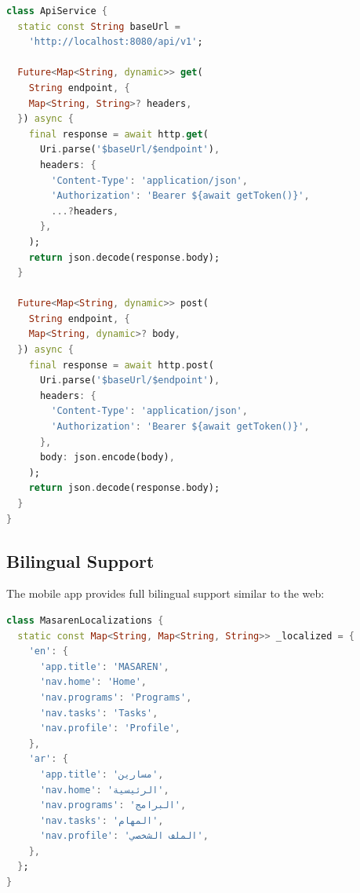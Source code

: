 \begin{lstlisting}[language=Dart, caption=API Service Layer]
class ApiService {
  static const String baseUrl =
    'http://localhost:8080/api/v1';

  Future<Map<String, dynamic>> get(
    String endpoint, {
    Map<String, String>? headers,
  }) async {
    final response = await http.get(
      Uri.parse('$baseUrl/$endpoint'),
      headers: {
        'Content-Type': 'application/json',
        'Authorization': 'Bearer ${await getToken()}',
        ...?headers,
      },
    );
    return json.decode(response.body);
  }

  Future<Map<String, dynamic>> post(
    String endpoint, {
    Map<String, dynamic>? body,
  }) async {
    final response = await http.post(
      Uri.parse('$baseUrl/$endpoint'),
      headers: {
        'Content-Type': 'application/json',
        'Authorization': 'Bearer ${await getToken()}',
      },
      body: json.encode(body),
    );
    return json.decode(response.body);
  }
}
\end{lstlisting}

\subsection{Bilingual Support}

The mobile app provides full bilingual support similar to the web:

\begin{lstlisting}[language=Dart, caption=Internationalization Setup]
class MasarenLocalizations {
  static const Map<String, Map<String, String>> _localized = {
    'en': {
      'app.title': 'MASAREN',
      'nav.home': 'Home',
      'nav.programs': 'Programs',
      'nav.tasks': 'Tasks',
      'nav.profile': 'Profile',
    },
    'ar': {
      'app.title': 'مسارين',
      'nav.home': 'الرئيسية',
      'nav.programs': 'البرامج',
      'nav.tasks': 'المهام',
      'nav.profile': 'الملف الشخصي',
    },
  };
}
\end{lstlisting}

\clearpage
